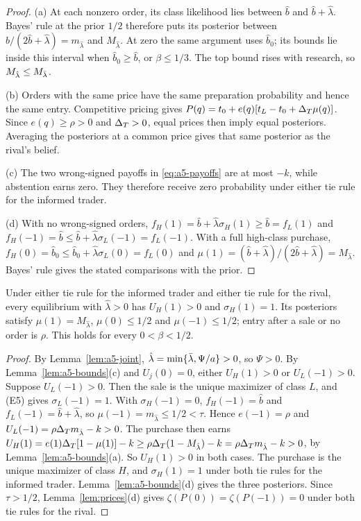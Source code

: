 \begin{proof}
(a) At each nonzero order, its class likelihood lies between \(\hat b\) and \(\hat b+\hat\lambda\).
Bayes' rule at the prior \(1/2\) therefore puts its posterior between
\(\hat b/(2\hat b+\hat\lambda)=m_{\hat\lambda}\) and \(M_{\hat\lambda}\).
At zero the same argument uses \(\hat b_0\); its bounds lie inside this interval when
\(\hat b_0\ge\hat b\), or \(\beta\le1/3\). The top bound rises with research, so
\(M_{\hat\lambda}\le M_{\bar\lambda}\).

(b) Orders with the same price have the same preparation probability and hence the same entry.
Competitive pricing gives
\(P(q)=t_0+e(q)[t_L-t_0+\Delta_T\mu(q)]\). Since \(e(q)\ge\rho>0\) and \(\Delta_T>0\), equal prices
then imply equal posteriors. Averaging the posteriors at a common price gives that same posterior as the
rival's belief.

(c) The two wrong-signed payoffs in \eqref{eq:a5-payoffs} are at most \(-k\), while abstention earns zero.
They therefore receive zero probability under either tie rule for the informed trader.

(d) With no wrong-signed orders,
\(f_H(1)=\hat b+\hat\lambda\sigma_H(1)\ge\hat b=f_L(1)\) and
\(f_H(-1)=\hat b\le\hat b+\hat\lambda\sigma_L(-1)=f_L(-1)\).
With a full high-class purchase,
\(f_H(0)=\hat b_0\le\hat b_0+\hat\lambda\sigma_L(0)=f_L(0)\) and
\(\mu(1)=(\hat b+\hat\lambda)/(2\hat b+\hat\lambda)=M_{\hat\lambda}\).
Bayes' rule gives the stated comparisons with the prior.
\end{proof}

\begin{lemma}\label{lem:a5-buy}
Under either tie rule for the informed trader and either tie rule for the rival, every equilibrium with \(\hat\lambda>0\) has
\(U_H(1)>0\) and \(\sigma_H(1)=1\). Its posteriors satisfy
\(\mu(1)=M_{\hat\lambda}\), \(\mu(0)\le1/2\) and \(\mu(-1)\le1/2\); entry after a sale or no order is
\(\rho\). This holds for every \(0<\beta<1/2\).
\end{lemma}

\begin{proof}
By Lemma~\ref{lem:a5-joint}, \(\hat\lambda=\min\{\bar\lambda,\Psi/a\}>0\), so \(\Psi>0\). By Lemma~\ref{lem:a5-bounds}(c) and
\(U_j(0)=0\), either \(U_H(1)>0\) or \(U_L(-1)>0\). Suppose \(U_L(-1)>0\). Then the sale is the unique maximizer of
class \(L\), and (E5) gives \(\sigma_L(-1)=1\). With \(\sigma_H(-1)=0\), \(f_H(-1)=\hat b\) and
\(f_L(-1)=\hat b+\hat\lambda\), so \(\mu(-1)=m_{\hat\lambda}\le1/2<\tau\). Hence \(e(-1)=\rho\) and
\(U_L(-1)=\rho\Delta_T m_{\hat\lambda}-k>0\). The purchase then earns
\(U_H(1)=e(1)\Delta_T[1-\mu(1)]-k\ge\rho\Delta_T(1-M_{\hat\lambda})-k=\rho\Delta_T m_{\hat\lambda}-k>0\), by
Lemma~\ref{lem:a5-bounds}(a). So \(U_H(1)>0\) in both cases. The purchase is the unique maximizer of class \(H\), and
\(\sigma_H(1)=1\) under both tie rules for the informed trader. Lemma~\ref{lem:a5-bounds}(d) gives the three posteriors. Since
\(\tau>1/2\), Lemma~\ref{lem:prices}(d) gives \(\zeta(P(0))=\zeta(P(-1))=0\) under both tie rules for the rival.
\end{proof}

